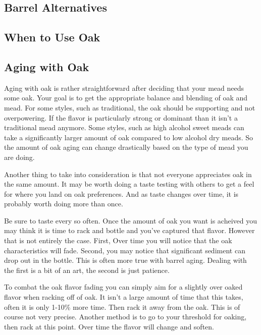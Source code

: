  \subsection{Barrel Alternatives}

 \subsection{When to Use Oak}

 \subsection{Aging with Oak}
  Aging with oak is rather straightforward after deciding that your mead needs some oak. Your goal is to get the
  appropriate balance and blending of oak and mead. For some styles, such as traditional, the oak should be supporting
  and not overpowering. If the flavor is particularly strong or dominant than it isn't a traditional mead anymore.
  Some styles, such as high alcohol sweet meads can take a significantly larger amount of oak compared to low alcohol
  dry meads. So the amount of oak aging can change drastically based on the type of mead you are doing. 

  Another thing to take into consideration is that not everyone appreciates oak in the same amount. It may be worth
  doing a taste testing with others to get a feel for where you land on oak preferences. And as taste changes
  over time, it is probably worth doing more than once.

  Be sure to taste every so often. Once the amount of oak you want is acheived you may think it is time to rack
  and bottle and you've captured that flavor. However that is not entirely the case. 
  First, Over time you will notice that the oak characteristics will fade. Second, you may notice that
  significant sediment can drop out in the bottle. This is often more true with barrel aging. Dealing with the first
  is a bit of an art, the second is just patience.

  To combat the oak flavor fading you can simply aim for a slightly over oaked flavor when racking off of oak. It
  isn't a large amount of time that this takes, often it is only 1-10\% more time. Then rack it away from the oak. 
  This is of course not very precise. Another method is to go to your threshold for oaking, then rack at this point.
  Over time the flavor will change and soften.

